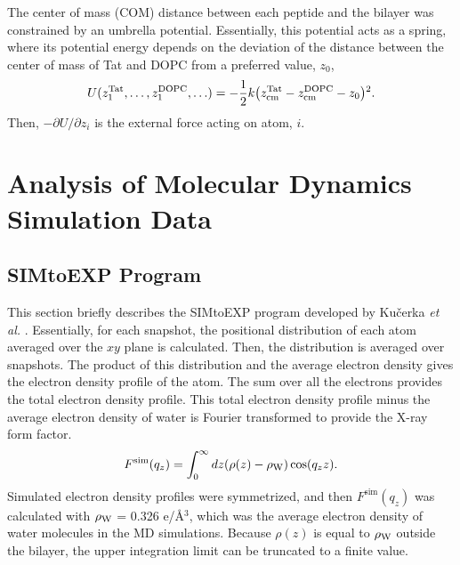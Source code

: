 The center of mass (COM) distance between each peptide and the bilayer was 
constrained by an umbrella potential. 
Essentially, this potential acts as a spring, 
where its potential energy depends on the deviation of the distance 
between the center of mass of Tat and DOPC from a preferred value, $z_0$,
\begin{equation*}
  U(z_1^{\textrm{Tat}},\ldots,z_1^{\textrm{DOPC}},\ldots) = 
  -\frac{1}{2} k 
  \mathopen{}\left( z_{\textrm{cm}}^{\textrm{Tat}} - z_{\textrm{cm}}^{\textrm{DOPC}} - z_0 \right)\mathclose{}^2.
\end{equation*}
Then, $-\partial U/\partial z_i$ is the external force acting 
on atom, $i$. 

\section{Analysis of Molecular Dynamics Simulation Data}
\subsection{SIMtoEXP Program}\label{sec:SIMtoEXP}
This section briefly describes the SIMtoEXP program
developed by Ku\v{c}erka \textit{et al.} \cite{Kucerka10}.
Essentially, for each snapshot, the positional distribution of each atom
averaged over the $xy$ plane is calculated. Then, the distribution is
averaged over snapshots. The product of this distribution and the average
electron density gives the electron density profile of the atom. The sum 
over all the electrons provides the total electron density profile. This total
electron density profile minus the average electron density of water
is Fourier transformed to provide the X-ray form factor.
\begin{equation}
  F^\textrm{sim}(q_z) = \int_0^\infty\mathop{dz} (\rho(z)-\rho_\textrm{W})\cos (q_zz).
\end{equation}
Simulated electron density profiles were symmetrized, and then
$F^\textrm{sim}(q_z)$ was calculated with $\rho_\textrm{W}$ = 0.326 e/\AA$^3$,
which was the average electron density of water molecules in the MD simulations.
Because $\rho(z)$ is equal to $\rho_\textrm{W}$ outside the bilayer, the upper 
integration limit can be truncated to a finite value. 

